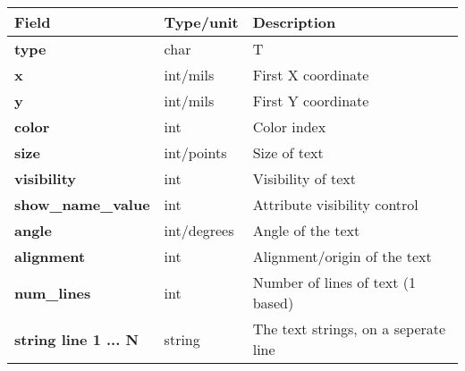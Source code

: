 \documentclass{article}
\begin{document}
\begin{table}[h]
\begin{tabular}{|l|l|l|} \hline
Field 		& Type/unit 	& Description \\ \hline 
\hline
{\bf type} 	& char 		& T \\ \hline
{\bf x} 	& int/mils	& First X coordinate \\ \hline
{\bf y} 	& int/mils	& First Y coordinate \\ \hline
{\bf color} 	& int		& Color index \\ \hline
{\bf size} 	& int/points	& Size of text \\ \hline
{\bf visibility}& int		& Visibility of text \\ \hline
{\bf show\_name\_value} & int	& Attribute visibility control \\ \hline
{\bf angle} 	& int/degrees	& Angle of the text \\ \hline
{\bf alignment} & int		& Alignment/origin of the text \\ \hline
{\bf num\_lines} & int		& Number of lines of text (1 based)\\ \hline
{\bf string line 1 ... N} 	& string	& The text strings, on a seperate line \\ \hline
\end{tabular}
\end{table}
\end{document}
